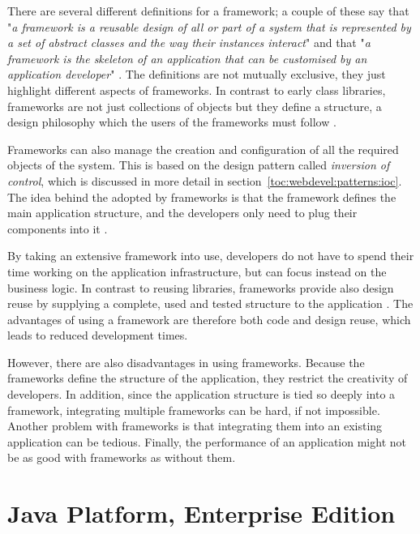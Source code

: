 There are several different definitions for a framework; a couple of 
these say that "\textsl{a framework is a reusable design of all or 
part of a system that is represented by a set of abstract classes and 
the way their instances interact}" and that "\textsl{a framework is 
the skeleton of an application that can be customised by an 
application developer}" \citep{fweqcomppat,compfwpat}. The 
definitions are not mutually exclusive, they just highlight different 
aspects of frameworks. In contrast to early class libraries, 
frameworks are not just collections of objects but they define a 
structure, a design philosophy which the users of the frameworks must 
follow \citep{frameworkselection}.

Frameworks can also manage the creation and configuration of all the 
required objects of the system. This is based on the design pattern 
called \textsl{inversion of control}, which is discussed in more 
detail in section~\ref{toc:webdevel:patterns:ioc}. The idea behind the 
 adopted by frameworks is that the framework defines the 
main application structure, and the developers only need to plug their 
components into it \citep{compfwpat}.

By taking an extensive framework into use, developers do not have to 
spend their time working on the application infrastructure, but can 
focus instead on the business logic. In contrast to reusing libraries, 
frameworks provide also design reuse by supplying a complete, used and 
tested structure to the application \citep{parviainen}. The advantages
of using a framework are therefore both code and design reuse, which
leads to reduced development times.

However, there are also disadvantages in using frameworks. Because the 
frameworks define the structure of the application, they restrict the 
creativity of developers. In addition, since the application structure 
is tied so deeply into a framework, integrating multiple frameworks 
can be hard, if not impossible. Another problem with frameworks is 
that integrating them into an existing application can be tedious. 
Finally, the performance of an application might not be as good with 
frameworks as without them. \citep{parviainen}


\section{Java Platform, Enterprise Edition}
\label{toc:webdevel:javaee}

